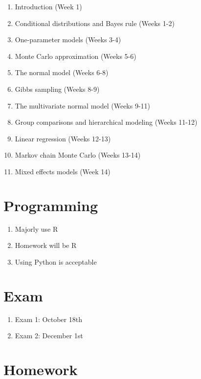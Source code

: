 \documentclass[
  letterpaper,
  DIV=11,
  numbers=noendperiod]{scrreprt}
\providecommand{\tightlist}{%
  \setlength{\itemsep}{0pt}\setlength{\parskip}{0pt}}\usepackage{longtable,booktabs,array}
\begin{document}
\begin{enumerate}
\def\labelenumi{\arabic{enumi}.}
\tightlist
\item
  Introduction (Week 1)
\item
  Conditional distributions and Bayes rule (Weeks 1-2)
\item
  One-parameter models (Weeks 3-4)
\item
  Monte Carlo approximation (Weeks 5-6)
\item
  The normal model (Weeks 6-8)
\item
  Gibbs sampling (Weeks 8-9)
\item
  The multivariate normal model (Weeks 9-11)
\item
  Group comparisons and hierarchical modeling (Weeks 11-12)
\item
  Linear regression (Weeks 12-13)
\item
  Markov chain Monte Carlo (Weeks 13-14)
\item
  Mixed effects models (Week 14)
\end{enumerate}

\hypertarget{programming}{%
\section*{Programming}\label{programming}}

\begin{enumerate}
\def\labelenumi{\arabic{enumi}.}
\tightlist
\item
  Majorly use R
\item
  Homework will be R
\item
  Using Python is acceptable
\end{enumerate}

\hypertarget{exam}{%
\section*{Exam}\label{exam}}

\begin{enumerate}
\def\labelenumi{\arabic{enumi}.}
\tightlist
\item
  Exam 1: October 18th
\item
  Exam 2: December 1st
\end{enumerate}

\hypertarget{homework}{%
\section*{Homework}\label{homework}}
\end{document}
